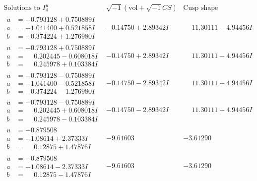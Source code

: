\documentclass[1p]{elsarticle_modified}
\theoremstyle{definition}
\newcommand{\I}{\sqrt{-1}}
\begin{document}
$$\begin{array}{c|c|c}  
\text{Solutions to }I^u_{4}& \I (\text{vol} + \sqrt{-1}CS) & \text{Cusp shape}\\
 \hline 
\begin{aligned}
u &= -0.793128 + 0.750889 I \\
a &= -1.041400 + 0.521858 I \\
b &= -0.374224 + 1.276980 I\end{aligned}
 & -0.14750 + 2.89342 I & \phantom{-}11.30111 - 4.94456 I \\ \hline\begin{aligned}
u &= -0.793128 + 0.750889 I \\
a &= \phantom{-}0.202445 - 0.608018 I \\
b &= \phantom{-}0.245978 + 0.103384 I\end{aligned}
 & -0.14750 + 2.89342 I & \phantom{-}11.30111 - 4.94456 I \\ \hline\begin{aligned}
u &= -0.793128 - 0.750889 I \\
a &= -1.041400 - 0.521858 I \\
b &= -0.374224 - 1.276980 I\end{aligned}
 & -0.14750 - 2.89342 I & \phantom{-}11.30111 + 4.94456 I \\ \hline\begin{aligned}
u &= -0.793128 - 0.750889 I \\
a &= \phantom{-}0.202445 + 0.608018 I \\
b &= \phantom{-}0.245978 - 0.103384 I\end{aligned}
 & -0.14750 - 2.89342 I & \phantom{-}11.30111 + 4.94456 I \\ \hline\begin{aligned}
u &= -0.879508\phantom{ +0.000000I} \\
a &= -1.08614 + 2.37333 I \\
b &= \phantom{-}0.12875 + 1.47876 I\end{aligned}
 & -9.61603\phantom{ +0.000000I} & -3.61290\phantom{ +0.000000I} \\ \hline\begin{aligned}
u &= -0.879508\phantom{ +0.000000I} \\
a &= -1.08614 - 2.37333 I \\
b &= \phantom{-}0.12875 - 1.47876 I\end{aligned}
 & -9.61603\phantom{ +0.000000I} & -3.61290\phantom{ +0.000000I} \\ \hline\begin{aligned}

\end{aligned}
\end{array}$$
\end{document}
